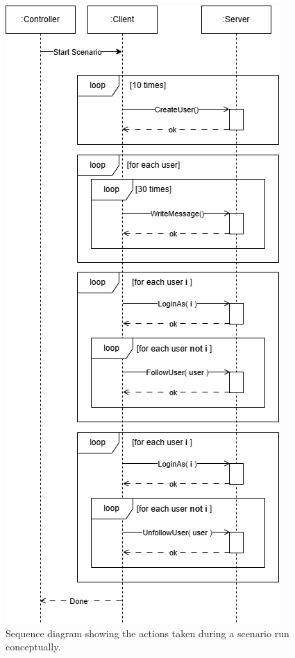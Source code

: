 \documentclass[main.tex]{subfiles}
\begin{document}
\begin{figure}[]
    \centering
    \includegraphics[width=\columnwidth]{media/experiment/experiment-scenario.png}
    \caption{Sequence diagram showing the actions taken during a scenario run conceptually.}
    \label{fig:experiment-scenario-sequence-diagram}
\end{figure}
\end{document}
